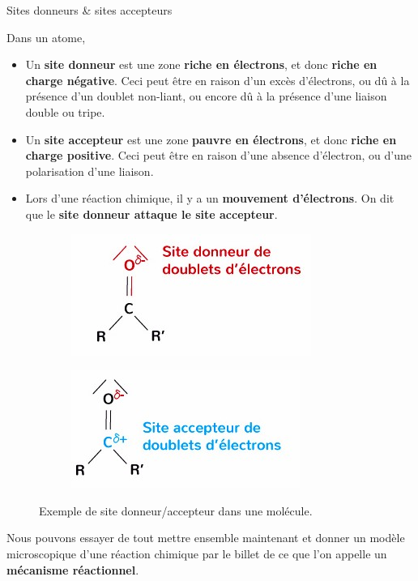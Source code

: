 \documentclass[11pt,a4paper]{article}
\begin{document}
\begin{defn}{Sites donneurs \& sites accepteurs}

Dans un atome, 
\begin{itemize}
    \item Un \textbf{site donneur} est une zone \textbf{riche en électrons}, et donc \textbf{riche en charge négative}. Ceci peut être en raison d'un excès d'électrons, ou dû à la présence d'un doublet non-liant, ou encore dû à la présence d'une liaison double ou tripe. 
    \item Un \textbf{site accepteur} est une zone \textbf{pauvre en électrons}, et donc \textbf{riche en charge positive}. Ceci peut être en raison d'une absence d'électron, ou d'une polarisation d'une liaison. 
    \item Lors d'une réaction chimique, il y a un \textbf{mouvement d'électrons}. On dit que le \textbf{site donneur attaque le site accepteur}. 
\end{itemize}
\end{defn}
\begin{figure}[ht]
\centering
\begin{subfigure}{.45\textwidth}
  \centering
  \includegraphics[width=.95\linewidth]{imgs/c4/donneur.jpg}  
\end{subfigure}
\begin{subfigure}{.45\textwidth}
  \centering
  \includegraphics[width=.95\linewidth]{imgs/c4/accepteur.jpg}  
\end{subfigure}
\caption{Exemple de site donneur/accepteur dans une molécule. }
\end{figure}
Nous pouvons essayer de tout mettre ensemble maintenant et donner un modèle microscopique d'une réaction chimique par le billet de ce que l'on appelle un \textbf{mécanisme réactionnel}.
\end{document}

